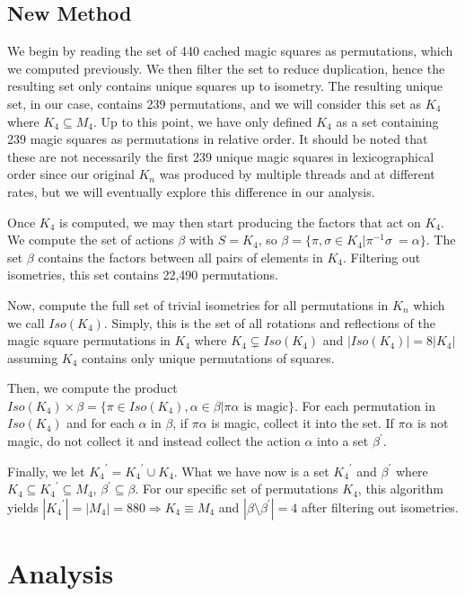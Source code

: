 \documentclass{rhumj_new}
\begin{document}
\subsection{New Method}

We begin by reading the set of 440 cached magic squares as permutations, which we computed
previously. We then filter the set to reduce duplication, hence the resulting set only contains
unique squares up to isometry. The resulting unique set, in our case, contains 239 permutations,
and we will consider this set as $K_4$ where $K_4\subseteq M_4$. Up to this point, we have only
defined $K_4$ as a set containing 239 magic squares as permutations in relative order. It should be
noted that these are not necessarily the first 239 unique magic squares in lexicographical order
since our original $K_n$ was produced by multiple threads and at different rates, but we will
eventually explore this difference in our analysis.

Once $K_4$ is computed, we may then start producing the factors that act on $K_4$. We compute the
set of actions $\beta$ with $S = K_4$, so  $\beta = \{\pi,\sigma\in K_4| \pi^{-1}\sigma\ =
  \alpha\}$. The set $\beta$ contains the factors between all pairs of elements in $K_4$. Filtering
out isometries, this set contains 22,490 permutations.

Now, compute the full set of trivial isometries for all permutations in $K_n$ which we call
$Iso(K_4)$. Simply, this is the set of all rotations and reflections of the magic square
permutations in $K_4$ where $K_4\subsetneq Iso(K_4)$ and $|Iso(K_4)| = 8|K_4|$ assuming $K_4$
contains only unique permutations of squares.

Then, we compute the product $Iso(K_4)\times\beta = \{\pi\in Iso(K_4),\alpha\in\beta | \pi\alpha
  \text{ is magic}\}$. For each permutation in $Iso(K_4)$ and for each $\alpha$ in $\beta$, if
$\pi\alpha$ is magic, collect it into the set. If $\pi\alpha$ is not magic, do not collect it and
instead collect the action $\alpha$ into a set ${\beta}^\prime$.

Finally, we let ${K_4}^\prime = {K_4}^\prime \cup K_4$. What we have now is a set ${K_4}^\prime$
and ${\beta}^\prime$ where $K_4 \subseteq {K_4}^\prime \subseteq M_4$, ${\beta}^\prime \subseteq
  \beta$. For our specific set of permutations $K_4$, this algorithm yields $|{K_4}^\prime| = |M_4|
  =
  880 \Rightarrow K_4 \equiv M_4$ and $|\beta \setminus{\beta}^\prime| = 4$ after filtering out
isometries.

\section{Analysis}
\end{document}
